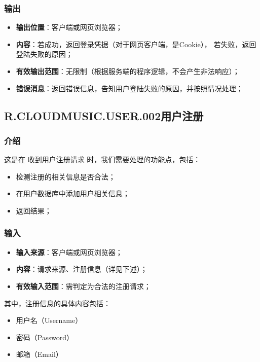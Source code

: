 \subsubsection{输出}
\begin{itemize}
	\item \textbf{输出位置}：客户端或网页浏览器；
	\item \textbf{内容}：若成功，返回登录凭据（对于网页客户端，是Cookie），
		若失败，返回登陆失败的原因；
	\item \textbf{有效输出范围}：无限制（根据服务端的程序逻辑，不会产生非法响应）；
	\item \textbf{错误消息}：返回错误信息，告知用户登陆失败的原因，并按照情况处理；
\end{itemize}

\subsection{R.CLOUDMUSIC.USER.002用户注册}
\subsubsection{介绍}
	这是在 收到用户注册请求 时，我们需要处理的功能点，包括：
	\begin{itemize}
		\item 检测注册的相关信息是否合法；
		\item 在用户数据库中添加用户相关信息；
		\item 返回结果；
	\end{itemize}
\subsubsection{输入}
	\begin{itemize}
		\item \textbf{输入来源}：客户端或网页浏览器；
		\item \textbf{内容}：请求来源、注册信息（详见下述）；
		\item \textbf{有效输入范围}：需判定为合法的注册请求；
	\end{itemize}
	\noindent 其中，注册信息的具体内容包括：
	\begin{itemize}
		\item 用户名（Username） 
		\item 密码（Password） 
		\item 邮箱（Email） 
	\end{itemize}
